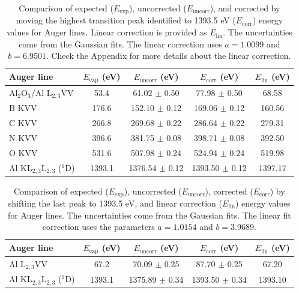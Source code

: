 \documentclass[12pt]{article}
\begin{document}
\begin{table}[h!]
    \centering
    \begin{tabular}{lcccc}
        \toprule
        \textbf{Auger line} & \textbf{\(E_{\text{exp}}\) (eV)} & \textbf{\(E_{\text{uncorr}}\) (eV)} & \textbf{\(E_{\text{corr}}\) (eV)} & \textbf{\(E_{\text{lin}}\) (eV)} \\
        \midrule
        $\text{Al}_2\text{O}_3\text{/Al}$ $\text{L}_{2,3}$VV & 53.4 & 61.02 $\pm$ 0.50 & 77.98 $\pm$ 0.50 & 68.58 \\
        B KVV & 176.6 & 152.10 $\pm$ 0.12 & 169.06 $\pm$ 0.12 & 160.56 \\
        C KVV & 266.8 & 269.68 $\pm$ 0.22 & 286.64 $\pm$ 0.22 & 279.31 \\
        N KVV & 396.6 & 381.75 $\pm$ 0.08 & 398.71 $\pm$ 0.08 & 392.50 \\
        O KVV & 531.6 & 507.98 $\pm$ 0.24 & 524.94 $\pm$ 0.24 & 519.98 \\
        Al $\text{KL}_{2,3} \text{L}_{2,3}$ ($^{1}$D) & 1393.1 & 1376.54 $\pm$ 0.12 & 1393.50 $\pm$ 0.12 & 1397.17 \\
        \bottomrule
    \end{tabular}
    \caption{Comparison of expected (\(E_{\text{exp}}\)), uncorrected (\(E_{\text{uncorr}}\)), and corrected by moving the highest transition peak identified to 1393.5 eV (\(E_{\text{corr}}\)) energy values for Auger lines. Linear correction is provided as \(E_{\text{lin}}\). The uncertainties come from the Gaussian fits. The linear correction uses $a = 1.0099$ and  $b = 6.9501$. Check the Appendix for more details about the linear correction.}
    \label{tab:alpeaks}
\end{table}
\begin{table}[h!]
    \centering
    \begin{tabular}{lcccc}
        \toprule
        \textbf{Auger line} & \textbf{\(E_{\text{exp}}\) (eV)} & \textbf{\(E_{\text{uncorr}}\) (eV)} & \textbf{\(E_{\text{corr}}\) (eV)} & \textbf{\(E_{\text{lin}}\) (eV)} \\
        \midrule
        Al $\text{L}_{2,3}$VV & 67.2 & 70.09 $\pm$ 0.25 & 87.70 $\pm$ 0.25 & 67.20 \\
        Al $\text{KL}_{2,3} \text{L}_{2,3}$ ($^{1}$D) & 1393.1 & 1375.89 $\pm$ 0.34 & 1393.50 $\pm$ 0.34 & 1393.10 \\
        \bottomrule
    \end{tabular}
    \caption{Comparison of expected (\(E_{\text{exp}}\)), uncorrected (\(E_{\text{uncorr}}\)), corrected (\(E_{\text{corr}}\)) by shifting the last peak to 1393.5 eV, and linear correction (\(E_{\text{lin}}\)) energy values for Auger lines. The uncertainties come from the Gaussian fits. The linear fit correction uses the parameters $a = 1.0154$ and $b = 3.9689$.}
    \label{tab:alpeaksclean}
\end{table}
\end{document}
